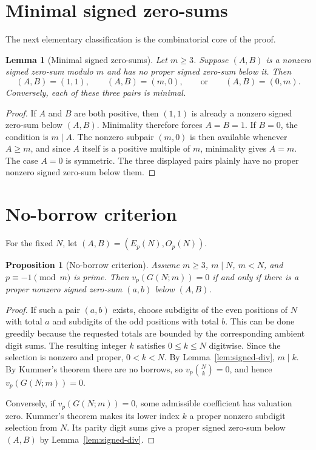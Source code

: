 \documentclass[11pt]{article}
\newtheorem{proposition}[theorem]{Proposition}
\newtheorem{lemma}[theorem]{Lemma}
\begin{document}
\section{Minimal signed zero-sums}\label{sec:minimal}

The next elementary classification is the combinatorial core of the proof.

\begin{lemma}[Minimal signed zero-sums]\label{lem:minimal}
Let $m\geq 3$.  Suppose $(A,B)$ is a nonzero signed zero-sum modulo $m$ and has
no proper signed zero-sum below it.  Then
\[
  (A,B)=(1,1),\qquad (A,B)=(m,0),\qquad\text{or}\qquad (A,B)=(0,m).
\]
Conversely, each of these three pairs is minimal.
\end{lemma}

\begin{proof}
If $A$ and $B$ are both positive, then $(1,1)$ is already a nonzero signed
zero-sum below $(A,B)$.  Minimality therefore forces $A=B=1$.  If $B=0$, the
condition is $m\mid A$.  The nonzero subpair $(m,0)$ is then available whenever
$A\geq m$, and since $A$ itself is a positive multiple of $m$, minimality gives
$A=m$.  The case $A=0$ is symmetric.  The three displayed pairs plainly have no
proper nonzero signed zero-sum below them.
\end{proof}

\section{No-borrow criterion}\label{sec:noborrow}

For the fixed $N$, let $(A,B)=(E_p(N),O_p(N))$.

\begin{proposition}[No-borrow criterion]\label{prop:noborrow}
Assume $m\geq 3$, $m\mid N$, $m<N$, and $p\equiv -1\pmod m$ is prime.  Then
$v_p(G(N;m))=0$ if and only if there is a proper nonzero signed zero-sum
$(a,b)$ below $(A,B)$.
\end{proposition}

\begin{proof}
If such a pair $(a,b)$ exists, choose subdigits of the even positions of $N$
with total $a$ and subdigits of the odd positions with total $b$.  This can be
done greedily because the requested totals are bounded by the corresponding
ambient digit sums.  The resulting integer $k$ satisfies $0\leq k\leq N$
digitwise.  Since the selection is nonzero and proper, $0<k<N$.  By
Lemma~\ref{lem:signed-div}, $m\mid k$.  By Kummer's theorem there are no
borrows, so $v_p\binom Nk=0$, and hence $v_p(G(N;m))=0$.

Conversely, if $v_p(G(N;m))=0$, some admissible coefficient has valuation zero.
Kummer's theorem makes its lower index $k$ a proper nonzero subdigit selection
from $N$.  Its parity digit sums give a proper signed zero-sum below $(A,B)$ by
Lemma~\ref{lem:signed-div}.
\end{proof}
\end{document}
